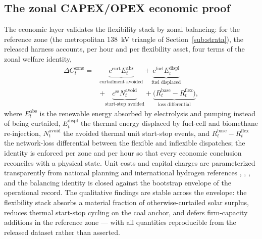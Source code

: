 \subsection{The zonal CAPEX/OPEX economic proof}
\label{sub:zonal}

The economic layer validates the flexibility stack by zonal balancing: for the reference zone (the metropolitan 138~kV triangle of Section~\ref{sub:strata}), the released harness accounts, per hour and per flexibility asset, four terms of the zonal welfare identity,
\begin{equation}
\begin{aligned}
\Delta C^{\mathrm{zone}}_t = {}& \underbrace{c^{\mathrm{curt}} E^{\mathrm{abs}}_t}_{\text{curtailment avoided}} + \underbrace{c^{\mathrm{fuel}} E^{\mathrm{displ}}_t}_{\text{fuel displaced}} \\
& + \underbrace{c^{\mathrm{ss}} N^{\mathrm{avoid}}_t}_{\text{start-stop avoided}} + \underbrace{\big(R^{\mathrm{base}}_t - R^{\mathrm{flex}}_t\big)}_{\text{loss differential}},
\end{aligned}
\label{eq:zonal}
\end{equation}
where $E^{\mathrm{abs}}_t$ is the renewable energy absorbed by electrolysis and pumping instead of being curtailed, $E^{\mathrm{displ}}_t$ the thermal energy displaced by fuel-cell and biomethane re-injection, $N^{\mathrm{avoid}}_t$ the avoided thermal unit start-stop events, and $R^{\mathrm{base}}_t - R^{\mathrm{flex}}_t$ the network-loss differential between the flexible and inflexible dispatches; the identity is enforced per zone and per hour so that every economic conclusion reconciles with a physical state. Unit costs and capital charges are parameterized transparently from national planning and international hydrogen references \cite{cne2022}, \cite{irena2020}, \cite{iea2023}, and the balancing identity is closed against the bootstrap envelope of the operational record. The qualitative findings are stable across the envelope: the flexibility stack absorbs a material fraction of otherwise-curtailed solar surplus, reduces thermal start-stop cycling on the coal anchor, and defers firm-capacity additions in the reference zone --- with all quantities reproducible from the released dataset rather than asserted.
